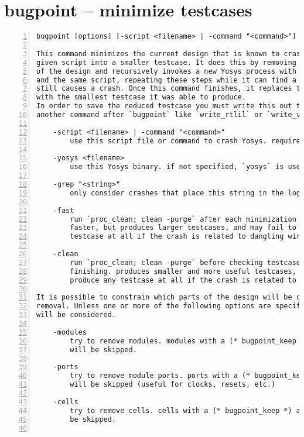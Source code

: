 \section{bugpoint -- minimize testcases}
\label{cmd:bugpoint}
\begin{lstlisting}[numbers=left,frame=single]
    bugpoint [options] [-script <filename> | -command "<command>"]

This command minimizes the current design that is known to crash Yosys with the
given script into a smaller testcase. It does this by removing an arbitrary part
of the design and recursively invokes a new Yosys process with this modified design
and the same script, repeating these steps while it can find a smaller design that
still causes a crash. Once this command finishes, it replaces the current design
with the smallest testcase it was able to produce.
In order to save the reduced testcase you must write this out to a file with
another command after `bugpoint` like `write_rtlil` or `write_verilog`.

    -script <filename> | -command "<command>"
        use this script file or command to crash Yosys. required.

    -yosys <filename>
        use this Yosys binary. if not specified, `yosys` is used.

    -grep "<string>"
        only consider crashes that place this string in the log file.

    -fast
        run `proc_clean; clean -purge` after each minimization step. converges
        faster, but produces larger testcases, and may fail to produce any
        testcase at all if the crash is related to dangling wires.

    -clean
        run `proc_clean; clean -purge` before checking testcase and after
        finishing. produces smaller and more useful testcases, but may fail to
        produce any testcase at all if the crash is related to dangling wires.

It is possible to constrain which parts of the design will be considered for
removal. Unless one or more of the following options are specified, all parts
will be considered.

    -modules
        try to remove modules. modules with a (* bugpoint_keep *) attribute
        will be skipped.

    -ports
        try to remove module ports. ports with a (* bugpoint_keep *) attribute
        will be skipped (useful for clocks, resets, etc.)

    -cells
        try to remove cells. cells with a (* bugpoint_keep *) attribute will
        be skipped.


\end{lstlisting}
